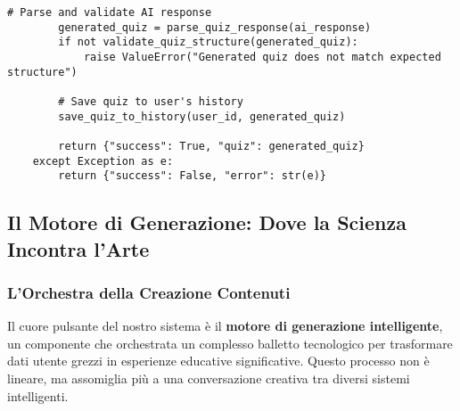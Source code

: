 \documentclass[12pt,a4paper]{article}
\begin{document}
\begin{lstlisting}[style=pythonstyle, caption=Generatore Quiz AI - Logica Adattiva, label=lst:quizgen]
        # Parse and validate AI response
        generated_quiz = parse_quiz_response(ai_response)
        if not validate_quiz_structure(generated_quiz):
            raise ValueError("Generated quiz does not match expected structure")
        
        # Save quiz to user's history
        save_quiz_to_history(user_id, generated_quiz)
        
        return {"success": True, "quiz": generated_quiz}
    except Exception as e:
        return {"success": False, "error": str(e)}
\end{lstlisting}

\subsection{Il Motore di Generazione: Dove la Scienza Incontra l'Arte}
\label{subsec:generation-engine}

\subsubsection{L'Orchestra della Creazione Contenuti}

Il cuore pulsante del nostro sistema è il \textbf{motore di generazione intelligente}, un componente che orchestrata un complesso balletto tecnologico per trasformare dati utente grezzi in esperienze educative significative. Questo processo non è lineare, ma assomiglia più a una conversazione creativa tra diversi sistemi intelligenti.
\end{document}
